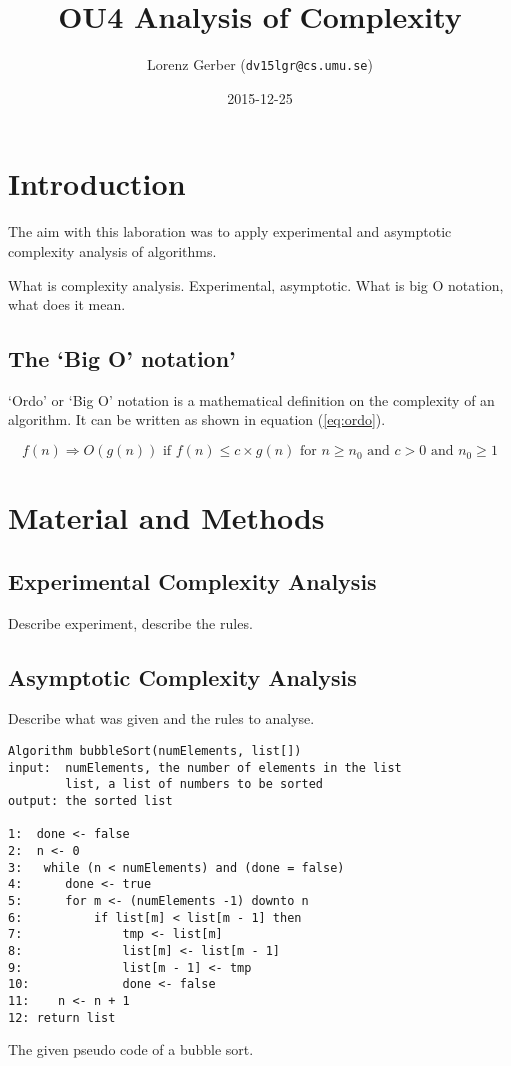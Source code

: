 \documentclass[a4paper,11pt,twoside]{article}
\title{OU4 Analysis of Complexity}
\author{Lorenz Gerber  ({\tt{dv15lgr@cs.umu.se}})}
\date{2015-12-25}
\begin{document}
\lstset{language=C}
\maketitle

\tableofcontents
\newpage

\section{Introduction} 
The aim with this laboration was to apply experimental and asymptotic
complexity analysis of algorithms. 

What is complexity analysis. Experimental, asymptotic. What is big O
notation, what does it mean.
\subsection{The `Big O' notation'}
`Ordo' or `Big O' notation is a mathematical definition on the
complexity of an algorithm. It can be written as shown in 
equation (\ref{eq:ordo})\cite[pp. 245]{janlert2000}.

\begin{equation} \label{eq:ordo}
f(n) \Rightarrow O(g(n)) \textrm{ if } f(n) \leq c \times g(n)
\textrm{ for } n \geq n_{0} \textrm{ and }
c > 0 \textrm{ and } n_{0} \geq 1
\end{equation}




\section{Material and Methods}

\subsection{Experimental Complexity Analysis}
Describe experiment, describe the rules.

\subsection{Asymptotic Complexity Analysis}
Describe what was given and the rules to analyse.
\begin{listing}\label{ls:bubble}
\begin{verbatim}
Algorithm bubbleSort(numElements, list[])
input:  numElements, the number of elements in the list
        list, a list of numbers to be sorted
output: the sorted list

1:  done <- false
2:  n <- 0
3:   while (n < numElements) and (done = false)
4:      done <- true
5:      for m <- (numElements -1) downto n
6:          if list[m] < list[m - 1] then
7:              tmp <- list[m]
8:              list[m] <- list[m - 1]
9:              list[m - 1] <- tmp
10:             done <- false
11:    n <- n + 1
12: return list 
\end{verbatim}
\caption{The given pseudo code of a bubble sort.}
\end{listing}
\end{document}
